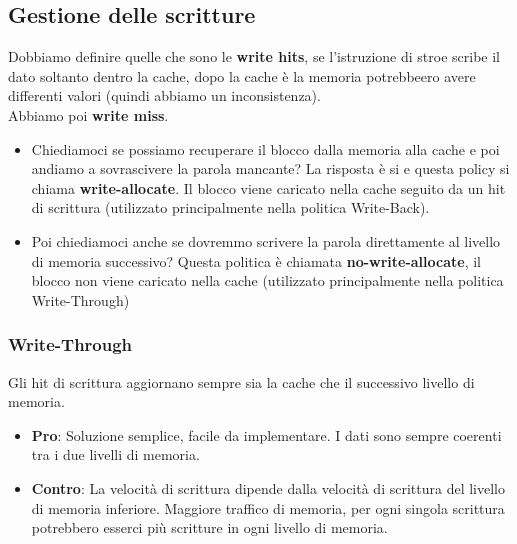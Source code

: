 \subsection{Gestione delle scritture}
Dobbiamo definire quelle che sono le \textbf{write hits}, se l'istruzione di stroe scribe il dato soltanto dentro la cache, dopo la cache
è la memoria potrebbeero avere differenti valori (quindi abbiamo un inconsistenza).\\
Abbiamo poi \textbf{write miss}. 
\begin{itemize}
    \item Chiediamoci se possiamo recuperare il blocco dalla memoria alla cache e poi andiamo a sovrascivere la parola mancante?
    La risposta è si e questa policy si chiama \textbf{write-allocate}.
    Il blocco viene caricato nella cache seguito da un hit di scrittura (utilizzato principalmente nella politica Write-Back).
    \item Poi chiediamoci anche se dovremmo scrivere la parola direttamente al livello di memoria successivo? 
    Questa politica è chiamata \textbf{no-write-allocate}, il blocco non viene caricato nella cache (utilizzato principalmente nella politica Write-Through)
\end{itemize}

\subsubsection{Write-Through}
Gli hit di scrittura aggiornano sempre sia la cache che il successivo livello di memoria.
\begin{itemize}
    \item \textbf{Pro}: Soluzione semplice, facile da implementare. I dati sono sempre coerenti tra i due livelli di memoria.
    \item \textbf{Contro}: La velocità di scrittura dipende dalla velocità di scrittura del livello di memoria inferiore. Maggiore traffico di memoria, per ogni singola scrittura potrebbero esserci più scritture in ogni livello di memoria.
\end{itemize}

